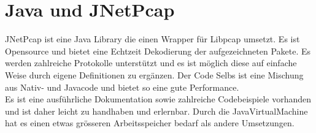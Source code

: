 \section{Java und JNetPcap}
\label{sec:Java und JNetPcap}

JNetPcap ist eine Java Library die einen Wrapper für Libpcap umsetzt. Es ist Opensource und bietet eine Echtzeit Dekodierung der aufgezeichneten Pakete.
Es werden zahlreiche Protokolle unterstützt und es ist möglich diese auf einfache Weise durch eigene Definitionen zu ergänzen.
Der Code Selbs ist eine Mischung aus Nativ- und Javacode und bietet so eine gute Performance.\\
Es ist eine ausführliche Dokumentation sowie zahlreiche Codebeispiele vorhanden und ist daher leicht zu handhaben und erlernbar.
Durch die JavaVirtualMachine hat es einen etwas grösseren Arbeitsspeicher bedarf als andere Umsetzungen.
